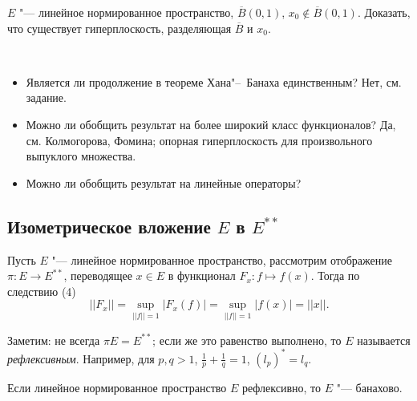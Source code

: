 \documentclass[main]{subfiles}
\begin{document}
\begin{exercise}
  $E$ "--- линейное нормированное пространство, $\overline{B}(0, 1)$, $x_0 \notin \overline{B}(0, 1)$.
  Доказать, что существует гиперплоскость, разделяющая $\overline{B}$
  и $x_0$.
\end{exercise}

\begin{remark}~
  \begin{itemize}
    \item Является ли продолжение в теореме Хана"--~Банаха
      единственным? Нет, см. задание.
    \item Можно ли обобщить результат на более широкий класс
      функционалов? Да, см. Колмогорова, Фомина;
      опорная гиперплоскость для произвольного выпуклого множества.
    \item Можно ли обобщить результат на линейные операторы?
  \end{itemize}
\end{remark}

\subsection{Изометрическое вложение $E$ в $E^{**}$}
Пусть $E$ "--- линейное нормированное пространство, рассмотрим отображение $\pi : E \to E^{**}$,
переводящее $x \in E$ в функционал $F_x : f \mapsto f(x)$.
Тогда по следствию (4)
\[
  ||F_x|| = \sup_{||f|| = 1} |F_x(f)| =
  \sup_{||f|| = 1} |f(x)| = ||x||.
\]

Заметим: не всегда $\pi E = E^{**}$; если же это равенство выполнено,
то $E$ называется \emph{рефлексивным}. Например, для $p, q > 1$,
$\frac1p + \frac1q = 1$, $(l_p)^* = l_q$.

\begin{exercise}
  Если линейное нормированное пространство $E$ рефлексивно, то $E$ "--- банахово.
\end{exercise}
\end{document}
